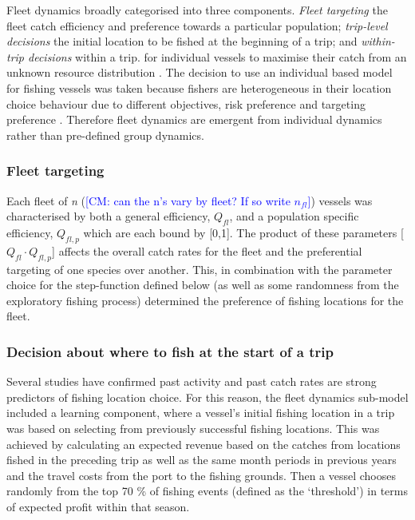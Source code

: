 \documentclass[review]{elsarticle}
\begin{document}
Fleet dynamics broadly categorised into three
components. \textit{Fleet targeting}  the
fleet catch efficiency and preference towards a particular population;
\textit{trip-level decisions}  the
initial location to be fished at the beginning of a trip; and
\textit{within-trip decisions}  within a trip.
 for individual vessels to
maximise their catch from an unknown resource distribution \citep{Bailey2018}.
The decision to use an individual based model for fishing vessels was taken
because fishers are heterogeneous in their location choice behaviour due to
different objectives, risk preference and targeting preference
\citep{VanPutten2012a, Boonstra2015}.  Therefore fleet dynamics are emergent
from individual dynamics rather than pre-defined group dynamics. 

\subsubsection{Fleet targeting}

Each fleet of \textit{n} (\textcolor{blue}{[CM: can the n's vary by fleet? If so write $n_{fl}$]}) vessels was characterised by both a general
efficiency, $Q_{fl}$, and a population specific efficiency, ${Q_{fl, p}}$ which
are each bound by [0,1]. The product of these parameters [$Q_{fl} \cdot
Q_{fl, p}$] affects the overall catch rates for the fleet and the preferential
targeting of one species over another. This, in combination with the
parameter choice for the step-function defined below (as well as some
randomness from the exploratory fishing process) determined the preference of
fishing locations for the fleet.  

\subsubsection{Decision about where to fish at the start of a trip}

Several studies \citep[for a review see][]{Girardin2016} have confirmed past activity
and past catch rates are strong predictors of fishing location choice. For this
reason, the fleet dynamics sub-model included a learning component, where a
vessel's initial fishing location in a trip was based on selecting from
previously successful fishing locations. This was achieved by calculating an
expected revenue based on the catches from locations fished in the preceding
trip as well as the same month periods in previous years and the travel costs
from the port to the fishing grounds. Then a vessel chooses randomly from the
top 70 \% of fishing events (defined as the `threshold') in terms of expected
profit within that season. 
\end{document}
